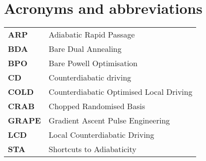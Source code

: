 \chapter{Acronyms and abbreviations}

\begin{table}[h]
      \begin{tabular}{p{3cm}  p{8cm}}

        \textbf{ARP}\label{acr:arp} & Adiabatic Rapid Passage \\ [7pt]
        \textbf{BDA}\label{acr:bda} & Bare Dual Annealing \\[7pt]
        \textbf{BPO}\label{acr:bpo} & Bare Powell Optimisation \\[7pt]
        \textbf{CD}\label{acr:cd} & Counterdiabatic driving \\[7pt]
        \textbf{COLD}\label{acr:cold} & Counterdiabatic Optimised Local Driving \\[7pt]
        \textbf{CRAB}\label{acr:crab} & Chopped Randomised Basis \\ [7pt]
        \textbf{GRAPE}\label{acr:grape} & Gradient Ascent Pulse Engineering \\ [7pt]
        \textbf{LCD}\label{acr:lcd} & Local Counterdiabatic Driving \\[7pt]
        \textbf{STA}\label{acr:sta} & Shortcuts to Adiabaticity \\[7pt]

    \end{tabular}

\end{table}\label{table}